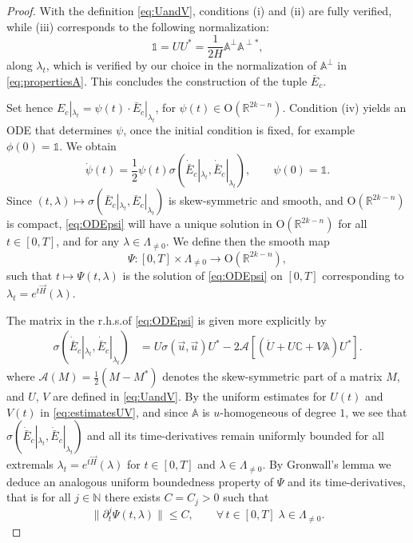 \documentclass[10pt,a4paper]{amsart}
\newcommand{\A}{\mathbb{A}}
\newcommand{\C}{\mathbb{C}}
\newcommand{\N}{\mathbb{N}} %
\newcommand{\R}{\mathbb{R}} %
\begin{document}
\begin{proof}
With the definition \eqref{eq:UandV}, conditions (i) and (ii) are fully verified, while (iii) corresponds to the following normalization:
\begin{equation}
\mathbb{1} = UU^* = \frac{1}{2H}\A^{\perp} \A^{\perp *},
\end{equation}
along $\lambda_t$, which is verified by our choice in the normalization of $\A^\perp$ in \eqref{eq:propertiesA}. This concludes the construction of the tuple $\bar{E}_c$.

Set hence $E_c|_{\lambda_t} = \psi(t)\cdot \bar{E}_c|_{\lambda_t}$, for $\psi(t) \in \mathrm{O}(\R^{2k-n})$. Condition (iv) yields an ODE that determines $\psi$, once the initial condition is fixed, for example $\phi(0) = \mathbb{1}$. We obtain
\begin{equation}\label{eq:ODEpsi}
\dot{\psi}(t) = \frac{1}{2}\psi(t)\sigma(\dot{\bar{E}}_c|_{\lambda_t},\dot{\bar{E}}_c|_{\lambda_t}), \qquad \psi(0)=\mathbb{1}.
\end{equation}
Since $(t,\lambda)\mapsto \sigma(\bar{E}_c|_{\lambda_t},\bar{E}_c|_{\lambda_t})$ is skew-symmetric and smooth, and $\mathrm{O}(\R^{2k-n})$ is compact, \eqref{eq:ODEpsi} will have a unique solution in $\mathrm{O}(\R^{2k-n})$ for all $t\in [0,T]$, and for any $\lambda \in \Lambda_{\neq 0}$. We define then the smooth map
\begin{equation}
\Psi : [0,T]\times \Lambda_{\neq 0} \to \mathrm{O}(\R^{2k-n}),
\end{equation}
such that $t\mapsto \Psi(t,\lambda)$ is the solution of \eqref{eq:ODEpsi} on $[0,T]$ corresponding to $\lambda_t = e^{t\vec{H}}(\lambda)$.

The matrix in the r.h.s.\@ of \eqref{eq:ODEpsi} is given more explicitly by\label{L: check this}
\begin{align}
\sigma(\dot{\bar{E}}_c|_{\lambda_t},\dot{\bar{E}}_c|_{\lambda_t}) & = U\sigma(\vec{u},\vec{u}) U^* -2\mathcal{A}\left[(\dot{U}+U\C+V\A)U^*\right].
\end{align}
where $\mathcal{A}(M)=\tfrac{1}{2}(M-M^*)$ denotes the skew-symmetric part of a matrix $M$, and $U$, $V$ are defined in \eqref{eq:UandV}. By the uniform estimates for $U(t)$ and $V(t)$ in \eqref{eq:estimatesUV}, and since $\A$ is $u$-homogeneous of degree $1$, we see that $\sigma(\dot{\bar{E}}_c|_{\lambda_t},\dot{\bar{E}}_c|_{\lambda_t})$ and all its time-derivatives remain uniformly bounded for all extremals $\lambda_t =e^{t\vec{H}}(\lambda)$ for $t\in [0,T]$ and $\lambda \in \Lambda_{\neq 0}$. By Gronwall's lemma we deduce an analogous uniform boundedness property of $\Psi$ and its time-derivatives, that is for all $j\in \N$ there exists $C=C_j >0$ such that
\begin{equation}
\|\partial_t^{j}\Psi(t,\lambda)\| \leq C, \qquad \forall\, t\in [0,T]\;  \lambda \in \Lambda_{\neq 0}.
\end{equation}


\end{proof}
\end{document}
